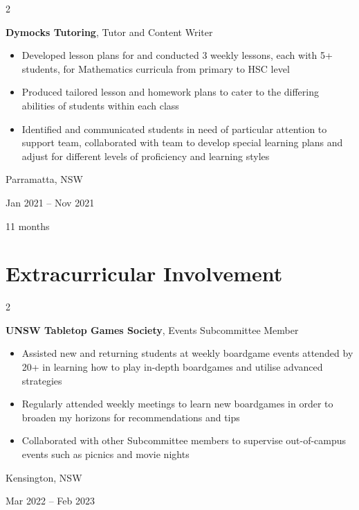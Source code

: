 \documentclass[10pt, a4paper]{article}
\newenvironment{highlights}{
    \begin{itemize}[
        topsep=0.10 cm,
        parsep=0.10 cm,
        partopsep=0pt,
        itemsep=0pt,
        leftmargin=0.4 cm + 10pt
    ]
}{
    \end{itemize}
} %
\newenvironment{twocolentry}[2][]{
    \onecolentry
    \def\secondColumn{#2}
    \setcolumnwidth{\fill, 4.5 cm}
    \begin{paracol}{2}
}{
    \switchcolumn \raggedleft \secondColumn
    \end{paracol}
    \endonecolentry
} %
\begin{document}
        \begin{twocolentry}{
            Parramatta, NSW

        Jan 2021 – Nov 2021

        11 months
        }
            \textbf{Dymocks Tutoring}, Tutor and Content Writer
            \begin{highlights}
                \item Developed lesson plans for and conducted 3 weekly lessons, each with 5+ students, for Mathematics curricula from primary to HSC level
                \item Produced tailored lesson and homework plans to cater to the differing abilities of students within each class
                \item Identified and communicated students in need of particular attention to support team, collaborated with team to develop special learning plans and adjust for different levels of proficiency and learning styles
            \end{highlights}
        \end{twocolentry}



    
    \section{Extracurricular Involvement}



        
        \begin{twocolentry}{
            Kensington, NSW

        Mar 2022 – Feb 2023
        }
            \textbf{UNSW Tabletop Games Society}, Events Subcommittee Member
            \begin{highlights}
                \item Assisted new and returning students at weekly boardgame events attended by 20+ in learning how to play in-depth boardgames and utilise advanced strategies
                \item Regularly attended weekly meetings to learn new boardgames in order to broaden my horizons for recommendations and tips
                \item Collaborated with other Subcommittee members to supervise out-of-campus events such as picnics and movie nights
            \end{highlights}
        \end{twocolentry}
\end{document}
